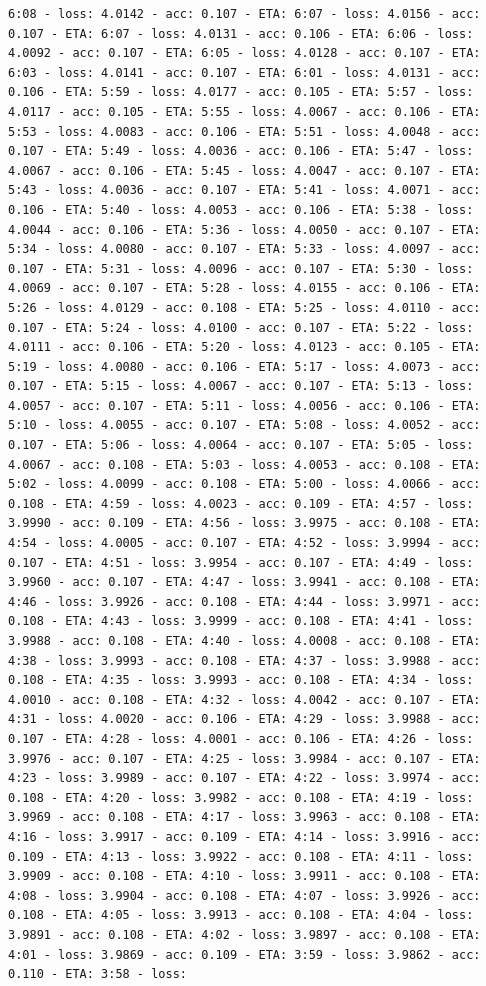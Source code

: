 \documentclass[11pt]{article}
\begin{document}
\begin{Verbatim}[commandchars=\\\{\}]
6:08 - loss: 4.0142 - acc: 0.107 - ETA: 6:07 - loss: 4.0156 - acc: 0.107 - ETA: 6:07 - loss: 4.0131 - acc: 0.106 - ETA: 6:06 - loss: 4.0092 - acc: 0.107 - ETA: 6:05 - loss: 4.0128 - acc: 0.107 - ETA: 6:03 - loss: 4.0141 - acc: 0.107 - ETA: 6:01 - loss: 4.0131 - acc: 0.106 - ETA: 5:59 - loss: 4.0177 - acc: 0.105 - ETA: 5:57 - loss: 4.0117 - acc: 0.105 - ETA: 5:55 - loss: 4.0067 - acc: 0.106 - ETA: 5:53 - loss: 4.0083 - acc: 0.106 - ETA: 5:51 - loss: 4.0048 - acc: 0.107 - ETA: 5:49 - loss: 4.0036 - acc: 0.106 - ETA: 5:47 - loss: 4.0067 - acc: 0.106 - ETA: 5:45 - loss: 4.0047 - acc: 0.107 - ETA: 5:43 - loss: 4.0036 - acc: 0.107 - ETA: 5:41 - loss: 4.0071 - acc: 0.106 - ETA: 5:40 - loss: 4.0053 - acc: 0.106 - ETA: 5:38 - loss: 4.0044 - acc: 0.106 - ETA: 5:36 - loss: 4.0050 - acc: 0.107 - ETA: 5:34 - loss: 4.0080 - acc: 0.107 - ETA: 5:33 - loss: 4.0097 - acc: 0.107 - ETA: 5:31 - loss: 4.0096 - acc: 0.107 - ETA: 5:30 - loss: 4.0069 - acc: 0.107 - ETA: 5:28 - loss: 4.0155 - acc: 0.106 - ETA: 5:26 - loss: 4.0129 - acc: 0.108 - ETA: 5:25 - loss: 4.0110 - acc: 0.107 - ETA: 5:24 - loss: 4.0100 - acc: 0.107 - ETA: 5:22 - loss: 4.0111 - acc: 0.106 - ETA: 5:20 - loss: 4.0123 - acc: 0.105 - ETA: 5:19 - loss: 4.0080 - acc: 0.106 - ETA: 5:17 - loss: 4.0073 - acc: 0.107 - ETA: 5:15 - loss: 4.0067 - acc: 0.107 - ETA: 5:13 - loss: 4.0057 - acc: 0.107 - ETA: 5:11 - loss: 4.0056 - acc: 0.106 - ETA: 5:10 - loss: 4.0055 - acc: 0.107 - ETA: 5:08 - loss: 4.0052 - acc: 0.107 - ETA: 5:06 - loss: 4.0064 - acc: 0.107 - ETA: 5:05 - loss: 4.0067 - acc: 0.108 - ETA: 5:03 - loss: 4.0053 - acc: 0.108 - ETA: 5:02 - loss: 4.0099 - acc: 0.108 - ETA: 5:00 - loss: 4.0066 - acc: 0.108 - ETA: 4:59 - loss: 4.0023 - acc: 0.109 - ETA: 4:57 - loss: 3.9990 - acc: 0.109 - ETA: 4:56 - loss: 3.9975 - acc: 0.108 - ETA: 4:54 - loss: 4.0005 - acc: 0.107 - ETA: 4:52 - loss: 3.9994 - acc: 0.107 - ETA: 4:51 - loss: 3.9954 - acc: 0.107 - ETA: 4:49 - loss: 3.9960 - acc: 0.107 - ETA: 4:47 - loss: 3.9941 - acc: 0.108 - ETA: 4:46 - loss: 3.9926 - acc: 0.108 - ETA: 4:44 - loss: 3.9971 - acc: 0.108 - ETA: 4:43 - loss: 3.9999 - acc: 0.108 - ETA: 4:41 - loss: 3.9988 - acc: 0.108 - ETA: 4:40 - loss: 4.0008 - acc: 0.108 - ETA: 4:38 - loss: 3.9993 - acc: 0.108 - ETA: 4:37 - loss: 3.9988 - acc: 0.108 - ETA: 4:35 - loss: 3.9993 - acc: 0.108 - ETA: 4:34 - loss: 4.0010 - acc: 0.108 - ETA: 4:32 - loss: 4.0042 - acc: 0.107 - ETA: 4:31 - loss: 4.0020 - acc: 0.106 - ETA: 4:29 - loss: 3.9988 - acc: 0.107 - ETA: 4:28 - loss: 4.0001 - acc: 0.106 - ETA: 4:26 - loss: 3.9976 - acc: 0.107 - ETA: 4:25 - loss: 3.9984 - acc: 0.107 - ETA: 4:23 - loss: 3.9989 - acc: 0.107 - ETA: 4:22 - loss: 3.9974 - acc: 0.108 - ETA: 4:20 - loss: 3.9982 - acc: 0.108 - ETA: 4:19 - loss: 3.9969 - acc: 0.108 - ETA: 4:17 - loss: 3.9963 - acc: 0.108 - ETA: 4:16 - loss: 3.9917 - acc: 0.109 - ETA: 4:14 - loss: 3.9916 - acc: 0.109 - ETA: 4:13 - loss: 3.9922 - acc: 0.108 - ETA: 4:11 - loss: 3.9909 - acc: 0.108 - ETA: 4:10 - loss: 3.9911 - acc: 0.108 - ETA: 4:08 - loss: 3.9904 - acc: 0.108 - ETA: 4:07 - loss: 3.9926 - acc: 0.108 - ETA: 4:05 - loss: 3.9913 - acc: 0.108 - ETA: 4:04 - loss: 3.9891 - acc: 0.108 - ETA: 4:02 - loss: 3.9897 - acc: 0.108 - ETA: 4:01 - loss: 3.9869 - acc: 0.109 - ETA: 3:59 - loss: 3.9862 - acc: 0.110 - ETA: 3:58 - loss: 
\end{Verbatim}
\end{document}

